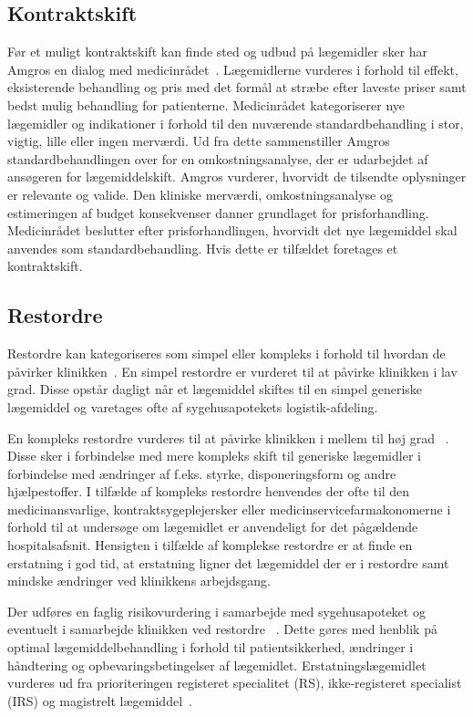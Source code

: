 \subsection{Kontraktskift}
Før et muligt kontraktskift kan finde sted og udbud på lægemidler sker har Amgros en dialog med medicinrådet~\citep{Amgros2017, Amgros2017a}. Lægemidlerne vurderes i forhold til effekt, eksisterende behandling og pris med det formål at stræbe efter laveste priser samt bedst mulig behandling for patienterne. Medicinrådet kategoriserer nye lægemidler og indikationer i forhold til den nuværende standardbehandling i stor, vigtig, lille eller ingen merværdi. Ud fra dette sammenstiller Amgros standardbehandlingen over for en omkostningsanalyse, der er udarbejdet af ansøgeren for lægemiddelskift. Amgros vurderer, hvorvidt de tilsendte oplysninger er relevante og valide. Den kliniske merværdi, omkostningsanalyse og estimeringen af budget konsekvenser danner grundlaget for prisforhandling. Medicinrådet beslutter efter prisforhandlingen, hvorvidt det nye lægemiddel skal anvendes som standardbehandling. Hvis dette er tilfældet foretages et kontraktskift.~\citep{Amgros2017, Amgros2017a}

\subsection{Restordre}
Restordre kan kategoriseres som simpel eller kompleks i forhold til hvordan de påvirker klinikken~\citep{Laegemiddelinformaion2017}. En simpel restordre er vurderet til at påvirke klinikken i lav grad. Disse opstår dagligt når et lægemiddel skiftes til en simpel generiske lægemiddel og varetages ofte af sygehusapotekets logistik-afdeling. ~\citep{Laegemiddelinformaion2017}

En kompleks restordre vurderes til at påvirke klinikken i mellem til høj grad ~\citep{Laegemiddelinformaion2017}. Disse sker i forbindelse med mere kompleks skift til generiske lægemidler i forbindelse med ændringer af f.eks. styrke, disponeringsform  og andre hjælpestoffer. I tilfælde af kompleks restordre henvendes der ofte til den medicinansvarlige, kontraktsygeplejersker eller medicinservicefarmakonomerne i forhold til at undersøge om lægemidlet er anvendeligt for det pågældende hospitalsafsnit. Hensigten i tilfælde af komplekse restordre er at finde en erstatning i god tid, at erstatning ligner det lægemiddel der er i restordre samt mindske ændringer ved klinikkens arbejdsgang.~\citep{Laegemiddelinformaion2017}

Der udføres en faglig risikovurdering i samarbejde med sygehusapoteket og eventuelt i samarbejde klinikken ved restordre ~\citep{Laegemiddelinformaion2017}. Dette gøres med henblik på optimal lægemiddelbehandling i forhold til patientsikkerhed, ændringer i håndtering og opbevaringsbetingelser af lægemidlet. Erstatningslægemidlet vurderes ud fra prioriteringen registeret specialitet (RS), ikke-registeret specialist (IRS) og magistrelt lægemiddel~\citep{Laegemiddelinformaion2017}.


